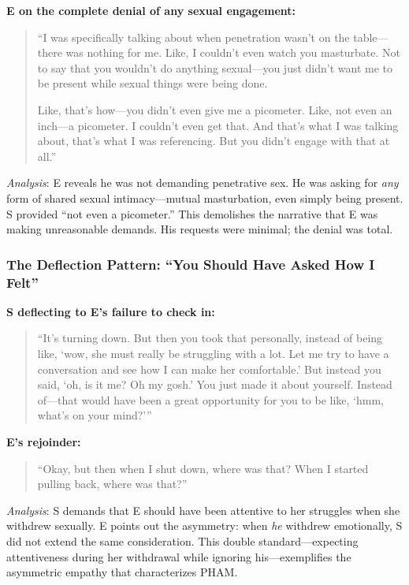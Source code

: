 \documentclass[12pt, letterpaper]{article}
\begin{document}
\textbf{E on the complete denial of any sexual engagement:}
\begin{quote}
``I was specifically talking about when penetration wasn't on the table---there was nothing for me. Like, I couldn't even watch you masturbate. Not to say that you wouldn't do anything sexual---you just didn't want me to be present while sexual things were being done.

Like, that's how---you didn't even give me a picometer. Like, not even an inch---a picometer. I couldn't even get that. And that's what I was talking about, that's what I was referencing. But you didn't engage with that at all.''
\end{quote}

\textit{Analysis}: E reveals he was not demanding penetrative sex. He was asking for \textit{any} form of shared sexual intimacy---mutual masturbation, even simply being present. S provided ``not even a picometer.'' This demolishes the narrative that E was making unreasonable demands. His requests were minimal; the denial was total.

\subsubsection{The Deflection Pattern: ``You Should Have Asked How I Felt''}

\textbf{S deflecting to E's failure to check in:}
\begin{quote}
``It's turning down. But then you took that personally, instead of being like, `wow, she must really be struggling with a lot. Let me try to have a conversation and see how I can make her comfortable.' But instead you said, `oh, is it me? Oh my gosh.' You just made it about yourself. Instead of---that would have been a great opportunity for you to be like, `hmm, what's on your mind?'''
\end{quote}

\textbf{E's rejoinder:}
\begin{quote}
``Okay, but then when I shut down, where was that? When I started pulling back, where was that?''
\end{quote}

\textit{Analysis}: S demands that E should have been attentive to her struggles when she withdrew sexually. E points out the asymmetry: when \textit{he} withdrew emotionally, S did not extend the same consideration. This double standard---expecting attentiveness during her withdrawal while ignoring his---exemplifies the asymmetric empathy that characterizes PHAM.
\end{document}
